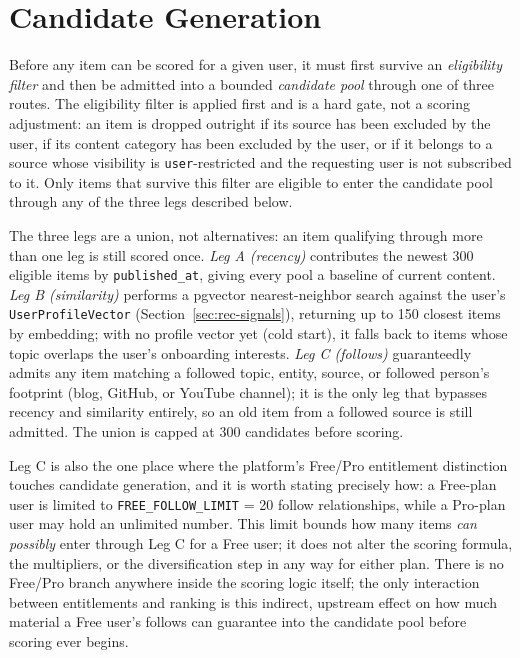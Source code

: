 \section{Candidate Generation}
\label{sec:rec-candidates}

Before any item can be scored for a given user, it must first survive an \emph{eligibility filter} and then be admitted into a bounded \emph{candidate pool} through one of three routes. The eligibility filter is applied first and is a hard gate, not a scoring adjustment: an item is dropped outright if its source has been excluded by the user, if its content category has been excluded by the user, or if it belongs to a source whose visibility is \texttt{user}-restricted and the requesting user is not subscribed to it. Only items that survive this filter are eligible to enter the candidate pool through any of the three legs described below.

The three legs are a union, not alternatives: an item qualifying through more than one leg is still scored once. \emph{Leg A (recency)} contributes the newest 300 eligible items by \texttt{published\_at}, giving every pool a baseline of current content. \emph{Leg B (similarity)} performs a pgvector nearest-neighbor search against the user's \texttt{UserProfileVector} (Section~\ref{sec:rec-signals}), returning up to 150 closest items by embedding; with no profile vector yet (cold start), it falls back to items whose topic overlaps the user's onboarding interests. \emph{Leg C (follows)} guaranteedly admits any item matching a followed topic, entity, source, or followed person's footprint (blog, GitHub, or YouTube channel); it is the only leg that bypasses recency and similarity entirely, so an old item from a followed source is still admitted. The union is capped at 300 candidates before scoring.

Leg C is also the one place where the platform's Free/Pro entitlement distinction touches candidate generation, and it is worth stating precisely how: a Free-plan user is limited to \texttt{FREE\_FOLLOW\_LIMIT} = 20 follow relationships, while a Pro-plan user may hold an unlimited number. This limit bounds how many items \emph{can possibly} enter through Leg C for a Free user; it does not alter the scoring formula, the multipliers, or the diversification step in any way for either plan. There is no Free/Pro branch anywhere inside the scoring logic itself; the only interaction between entitlements and ranking is this indirect, upstream effect on how much material a Free user's follows can guarantee into the candidate pool before scoring ever begins.

